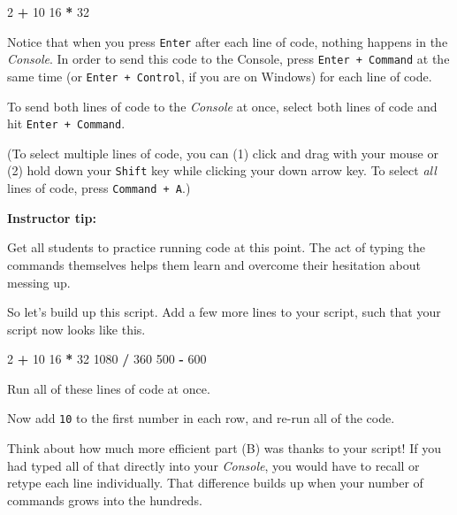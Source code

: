 \documentclass[]{book}
\newenvironment{Shaded}{\begin{snugshade}}{\end{snugshade}}
\newcommand{\DecValTok}[1]{\textcolor[rgb]{0.00,0.00,0.81}{#1}}
\newcommand{\OperatorTok}[1]{\textcolor[rgb]{0.81,0.36,0.00}{\textbf{#1}}}
\newcommand{\StringTok}[1]{\textcolor[rgb]{0.31,0.60,0.02}{#1}}
\begin{document}
\begin{Shaded}
\begin{Highlighting}[]
\DecValTok{2}  \OperatorTok{+}\StringTok{ }\DecValTok{10}
\DecValTok{16} \OperatorTok{*}\StringTok{ }\DecValTok{32}
\end{Highlighting}
\end{Shaded}

Notice that when you press \texttt{Enter} after each line of code, nothing happens in the \emph{Console}. In order to send this code to the Console, press \texttt{Enter\ +\ Command} at the same time (or \texttt{Enter\ +\ Control}, if you are on Windows) for each line of code.

To send both lines of code to the \emph{Console} at once, select both lines of code and hit \texttt{Enter\ +\ Command}.

(To select multiple lines of code, you can (1) click and drag with your mouse or (2) hold down your \texttt{Shift} key while clicking your down arrow key. To select \emph{all} lines of code, press \texttt{Command\ +\ A}.)

\leavevmode\hypertarget{tip-text}{}%
\textbf{Instructor tip:}

Get all students to practice running code at this point. The act of typing the commands themselves helps them learn and overcome their hesitation about messing up.

So let's build up this script. Add a few more lines to your script, such that your script now looks like this.

\begin{Shaded}
\begin{Highlighting}[]
\DecValTok{2}  \OperatorTok{+}\StringTok{ }\DecValTok{10}
\DecValTok{16} \OperatorTok{*}\StringTok{ }\DecValTok{32}
\DecValTok{1080} \OperatorTok{/}\StringTok{ }\DecValTok{360}
\DecValTok{500} \OperatorTok{-}\StringTok{ }\DecValTok{600}
\end{Highlighting}
\end{Shaded}

Run all of these lines of code at once.

Now add \texttt{10} to the first number in each row, and re-run all of the code.

Think about how much more efficient part (B) was thanks to your script! If you had typed all of that directly into your \emph{Console}, you would have to recall or retype each line individually. That difference builds up when your number of commands grows into the hundreds.
\end{document}
